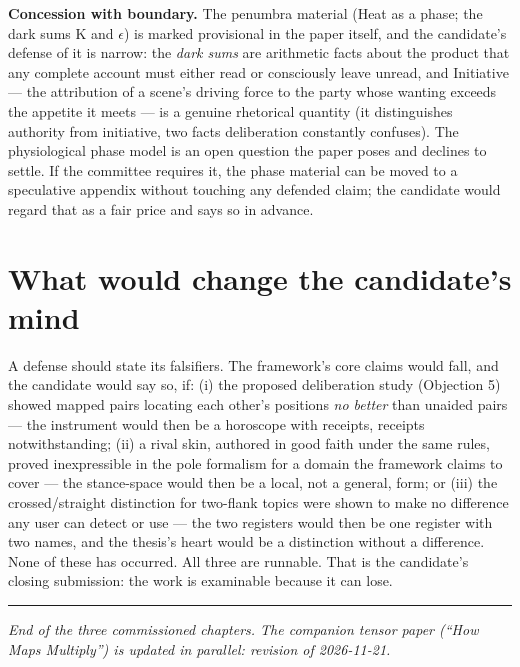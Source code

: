 \textbf{Concession with boundary.} The penumbra material (Heat as a
phase; the dark sums K and $\epsilon$) is marked provisional in the paper itself,
and the candidate's defense of it is narrow: the \emph{dark sums} are
arithmetic facts about the product that any complete account must either
read or consciously leave unread, and Initiative --- the attribution of
a scene's driving force to the party whose wanting exceeds the appetite
it meets --- is a genuine rhetorical quantity (it distinguishes
authority from initiative, two facts deliberation constantly confuses).
The physiological phase model is an open question the paper poses and
declines to settle. If the committee requires it, the phase material can
be moved to a speculative appendix without touching any defended claim;
the candidate would regard that as a fair price and says so in advance.

\section{What would change the candidate's
mind}\label{what-would-change-the-candidates-mind}

A defense should state its falsifiers. The framework's core claims would
fall, and the candidate would say so, if: (i) the proposed deliberation
study (Objection 5) showed mapped pairs locating each other's positions
\emph{no better} than unaided pairs --- the instrument would then be a
horoscope with receipts, receipts notwithstanding; (ii) a rival skin,
authored in good faith under the same rules, proved inexpressible in the
pole formalism for a domain the framework claims to cover --- the
stance-space would then be a local, not a general, form; or (iii) the
crossed/straight distinction for two-flank topics were shown to make no
difference any user can detect or use --- the two registers would then
be one register with two names, and the thesis's heart would be a
distinction without a difference. None of these has occurred. All three
are runnable. That is the candidate's closing submission: the work is
examinable because it can lose.

\begin{center}\rule{0.5\linewidth}{0.5pt}\end{center}

\emph{End of the three commissioned chapters. The companion tensor paper
(``How Maps Multiply'') is updated in parallel: revision of 2026-11-21.}
